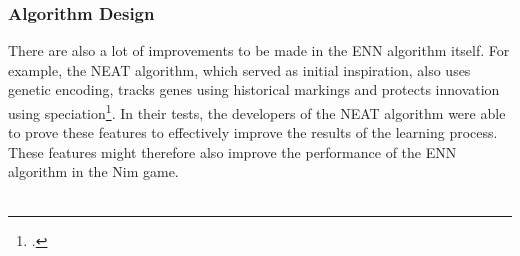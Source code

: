 \subsubsection{Algorithm Design}
There are also a lot of improvements to be made in the ENN algorithm itself.
For example, the NEAT algorithm, which served as initial inspiration, also uses genetic encoding, tracks genes using historical markings and protects innovation using speciation\footcite{Neat_02}.
In their tests, the developers of the NEAT algorithm were able to prove these features to effectively improve the results of the learning process.
These features might therefore also improve the performance of the ENN algorithm in the Nim game.
\\ \\
\vspace*{5cm}
\noindent{}


\cleardoublepage %
\printbibliography[title=References]